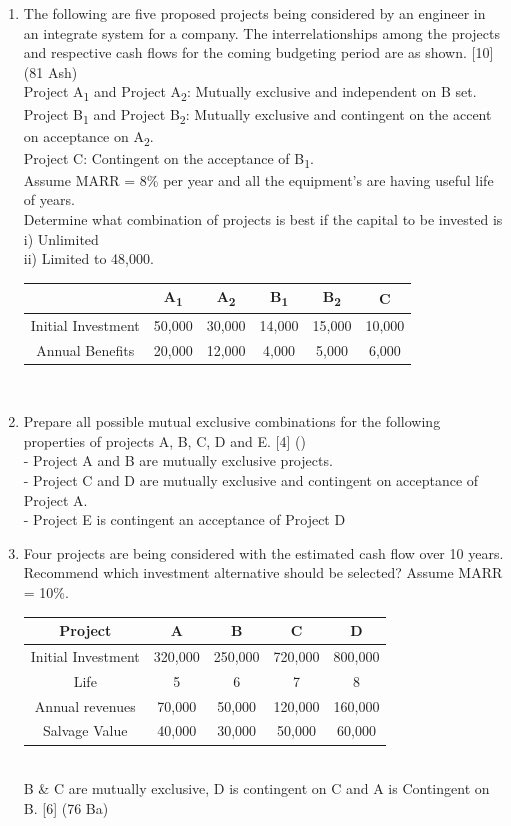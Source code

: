 \documentclass[12pt]{article}
\newcommand{\sub}[1]{\textsubscript{#1}}
\begin{document}
\begin{enumerate}[noitemsep, topsep = 0pt]
			\item The following are five proposed projects being considered by an engineer in an integrate system for a company. The interrelationships among the projects and respective cash flows for the coming budgeting period are as shown. \hfill [10] (81 Ash)\\
			Project A\sub{1} and Project A\sub{2}: Mutually exclusive and independent on B set.\\
			Project B\sub{1} and Project B\sub{2}: Mutually exclusive and contingent on the accent on acceptance on A\sub{2}.\\
			Project C: Contingent on the acceptance of B\sub{1}.\\
			Assume MARR = 8\% per year and all the equipment's are having useful life of years.\\
			Determine what combination of projects is best if the capital to be invested is\\
			i) Unlimited\\
			ii) Limited to 48,000.\\
			\begin{tabular}{|c|c|c|c|c|c|}
				\hline
				& A\sub{1} & A\sub{2} & B\sub{1} & B\sub{2} & C \\ \hline
				Initial Investment & 50,000 & 30,000 & 14,000 & 15,000 & 10,000 \\ \hline
				Annual Benefits & 20,000 & 12,000 & 4,000 & 5,000 & 6,000 \\ \hline
			\end{tabular}\\[0pt]
			
			\item Prepare all possible mutual exclusive combinations for the following properties of projects A, B, C, D and E. \hfill [4] ()\\
			- Project A and B are mutually exclusive projects.\\
			- Project C and D are mutually exclusive and contingent on acceptance of Project A.\\
			- Project E is contingent an acceptance of Project D 
			
			\item Four projects are being considered with the estimated cash flow over 10 years. Recommend which investment alternative should be selected? Assume MARR = 10\%. \\
			\begin{tabular}{|c|c|c|c|c|}
				\hline
				Project & A & B & C & D \\ \hline
				Initial Investment & 320,000 & 250,000 & 720,000 & 800,000 \\ \hline
				Life & 5 & 6 & 7 & 8 \\ \hline
				Annual revenues & 70,000 & 50,000 & 120,000 & 160,000 \\ \hline
				Salvage Value & 40,000 & 30,000 & 50,000 & 60,000 \\ \hline
			\end{tabular}\\
			B \& C are mutually exclusive, D is contingent on C and A is Contingent on B. \hfill [6] (76 Ba)
		\end{enumerate}
\end{document}
